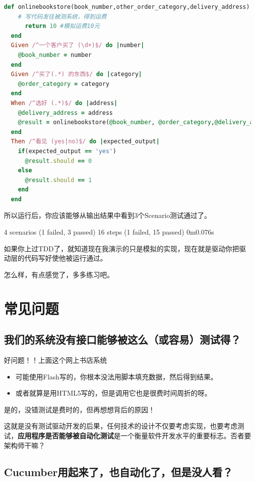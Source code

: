 \begin{lstlisting}[language=ruby]
  def onlinebookstore(book_number,other_order_category,delivery_address)
    # 写代码发往被测系统，得到运费
      return 10 #模拟运费10元
  end
  Given /^一个客户买了 (\d+)$/ do |number|
    @book_number = number
  end
  Given /^买了(.*) 的东西$/ do |category|
    @order_category = category
  end
  When /^选好 (.*)$/ do |address|
    @delivery_address = address
    @result = onlinebookstore(@book_number, @order_category,@delivery_address)
  end
  Then /^看见 (yes|no)$/ do |expected_output|
    if(expected_output == 'yes')
      @result.should == 0
    else
      @result.should == 1
    end
  end    
\end{lstlisting}

所以运行后，你应该能够从输出结果中看到3个Scenario测试通过了。

4 scenarios (1 failed, 3 passed)
 16 steps (1 failed, 15 passed)
 0m0.076s

如果你上过TDD了，就知道现在我演示的只是模拟的实现，现在就是驱动你把驱动层的代码写好使他被运行通过。

怎么样，有点感觉了，多多练习吧。

\section{常见问题}
\label{常见问题}

\subsection{我们的系统没有接口能够被这么（或容易）测试得？}
\label{我们的系统没有接口能够被这么（或容易）测试得？}

好问题！！上面这个网上书店系统

\begin{itemize}
\item 可能使用Flash写的，你根本没法用脚本填充数据，然后得到结果。

\item 或者就算是用HTML5写的，但是调用它也是很费时间周折的呀。

\end{itemize}

是的，没错测试是费时的，但再想想背后的原因！

这就是没有测试驱动开发的后果，任何技术的设计不仅要考虑实现，也要考虑测试，\textbf{应用程序是否能够被自动化测试}是一个衡量软件开发水平的重要标志。否者要架构师干嘛？

\subsection{Cucumber用起来了，也自动化了，但是没人看？}
\label{cucumber用起来了，也自动化了，但是没人看？}

